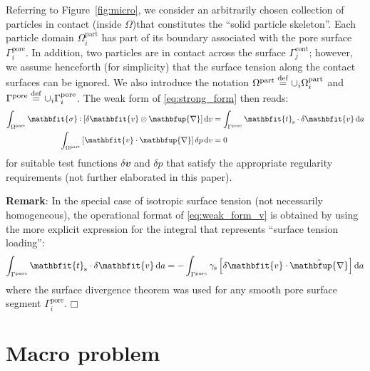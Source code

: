 \documentclass[12pt,a4paper,fleqn]{article}
\renewcommand{\ta}[1]{\mathbfit{#1}}
\renewcommand{\ts}[1]{\mathbfit{#1}}
\renewcommand{\diff}{\mathbfup{\nabla}}
\renewcommand{\Box}{\mdlgwhtsquare}
\newcommand{\figref}[1]{Figure~\ref{#1}}
\newcommand{\pore}{\mathrm{pore}}
\newcommand{\particle}{\mathrm{part}}
\newcommand{\contact}{\mathrm{cont}}
\newcommand{\internal}{\mathrm{int}}
\newcommand{\surf}{\mathrm{s}}
\begin{document}
Referring to \figref{fig:micro}, we consider an arbitrarily chosen collection of particles in contact (inside $\Omega$)that constitutes the ``solid particle skeleton''.
Each particle domain $\Omega_i^\particle$ has part of its boundary associated with the pore surface $\Gamma_i^\pore$.
In addition, two particles are in contact across the surface $\Gamma_j^\contact$; however, we assume henceforth (for simplicity) that the surface tension along the contact surfaces can be ignored. We also introduce the notation $\Omega^\particle \defeq\cup_i\Omega_i^\particle$ and $\Gamma^\pore \defeq \cup_i\Gamma^\pore_i$.
The weak form of \eqref{eq:strong_form} then reads:
\begin{subequations}\label{eq:weak_form}
\begin{align}
    \int_{\Omega^\particle} \ts{\sigma}\dprod[\delta \ta v\outerp\diff] \dif v
    & =
    \int_{\Gamma^\pore} \ta{t}_\surf \cdot \delta\ta{v} \dif a
\label{eq:weak_form_v} \\
    \int_{\Omega^\particle} \left[\ta{v}\cdot\diff\right] \delta p \dif v
    & =  0
\label{eq:weak_form_p}
\end{align}
\end{subequations}
for suitable test functions $\delta\ta{v}$ and $\delta p$ that satisfy the appropriate regularity requirements (not further elaborated in this paper).

\textbf{Remark}: In the special case of isotropic surface tension (not necessarily homogeneous), the operational format of \eqref{eq:weak_form_v} is obtained by using the more explicit expression for the integral that represents ``surface tension loading'':
\begin{equation}
    \int_{\Gamma^\pore} \ta{t}_\surf \cdot \delta\ta{v} \dif a =
    -\int_{\Gamma^\pore} \gamma_\surf\left[\delta\ta{v}\cdot\hat{\diff}\right] \dif a
\label{eq:surface_traction_weak}
\end{equation}
where the surface divergence theorem was used for any smooth pore surface segment $\Gamma^\pore_i$. $\Box$

\section{Macro problem}
\end{document}
